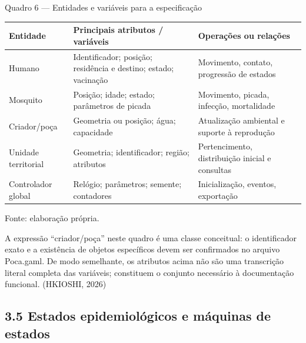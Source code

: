 Quadro 6 --- Entidades e variáveis para a especificação

\begin{longtable}[]{@{}
  >{\raggedright\arraybackslash}p{}
  >{\raggedright\arraybackslash}p{}
  >{\raggedright\arraybackslash}p{}@{}}
\toprule\noalign{}
\begin{minipage}[b]{\linewidth}\raggedright
\textbf{Entidade}
\end{minipage} & \begin{minipage}[b]{\linewidth}\raggedright
\textbf{Principais atributos / variáveis}
\end{minipage} & \begin{minipage}[b]{\linewidth}\raggedright
\textbf{Operações ou relações}
\end{minipage} \\
\midrule\noalign{}
\endhead
\bottomrule\noalign{}
\endlastfoot
Humano & Identificador; posição; residência e destino; estado; vacinação
& Movimento, contato, progressão de estados \\
Mosquito & Posição; idade; estado; parâmetros de picada & Movimento,
picada, infecção, mortalidade \\
Criador/poça & Geometria ou posição; água; capacidade & Atualização
ambiental e suporte à reprodução \\
Unidade territorial & Geometria; identificador; região; atributos &
Pertencimento, distribuição inicial e consultas \\
Controlador global & Relógio; parâmetros; semente; contadores &
Inicialização, eventos, exportação \\
\end{longtable}

Fonte: elaboração própria.

A expressão ``criador/poça'' neste quadro é uma classe conceitual: o
identificador exato e a existência de objetos específicos devem ser
confirmados no arquivo Poca.gaml. De modo semelhante, os atributos acima
não são uma transcrição literal completa das variáveis; constituem o
conjunto necessário à documentação funcional. (HKIOSHI, 2026)

\subsection{3.5 Estados epidemiológicos e máquinas de
estados}\label{estados-epidemioluxf3gicos-e-muxe1quinas-de-estados}

